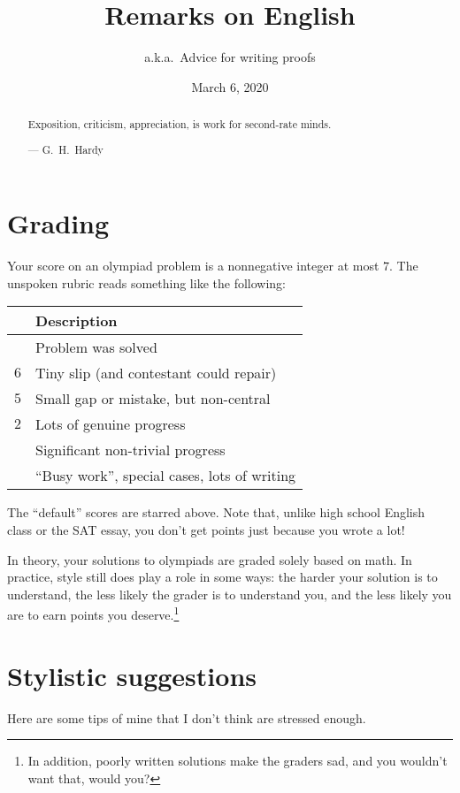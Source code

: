 \documentclass[11pt]{scrartcl}
\begin{document}
\title{Remarks on English}
\subtitle{a.k.a.\ Advice for writing proofs}
\date{March 6, 2020}
\maketitle

\begin{abstract}
	\sffamily\small
	Exposition, criticism, appreciation, is work for second-rate minds.

	\medskip

	--- G.\ H.\ Hardy
\end{abstract}

\section{Grading}
Your score on an olympiad problem is a nonnegative integer at most $7$.
The unspoken rubric reads something like the following:
\begin{center}
\begin{tabular}[h]{ll}
	& Description \\ \hline
	\boldmath{$7^\ast$} & Problem was solved \\
	$6$ & Tiny slip (and contestant could repair) \\
	$5$ & Small gap or mistake, but non-central \\ \hline
	$2$ & Lots of genuine progress \\
	\boldmath{$1^\ast$} & Significant non-trivial progress \\
	\boldmath{$0^\ast$} & ``Busy work'', special cases, lots of writing
\end{tabular}
\end{center}
The ``default'' scores are starred above.
Note that, unlike high school English class or the SAT essay,
you don't get points just because you wrote a lot!

In theory, your solutions to olympiads are graded solely based on math.
In practice, style still does play a role in some ways:
the harder your solution is to understand,
the less likely the grader is to understand you,
and the less likely you are to earn points you deserve.\footnote{In addition,
	poorly written solutions make the graders sad,
	and you wouldn't want that, would you?}

\section{Stylistic suggestions}
Here are some tips of mine that I don't think are stressed enough.
\end{document}
